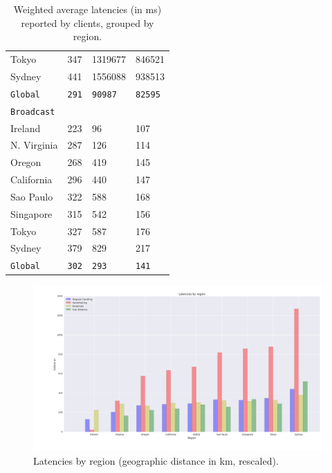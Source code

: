 \documentclass{uvamscse}
\begin{document}
\begin{table}[h]
\begin{center}
\begin{tabular}{llll}
  Tokyo                         & 347                 & 1319677              & 846521                 \\
  Sydney                        & 441                 & 1556088              & 938513                 \\
  \texttt{Global}               & \texttt{291}        & \texttt{90987}       & \texttt{82595}                 \\
  \hline
  \texttt{Broadcast} \\
  Ireland                       & 223                 & 96                   & 107                 \\
  N. Virginia                   & 287                 & 126                  & 114                 \\
  Oregon                        & 268                 & 419                  & 145                 \\
  California                    & 296                 & 440                  & 147                 \\
  Sao Paulo                     & 322                 & 588                  & 168                 \\
  Singapore                     & 315                 & 542                  & 156                 \\
  Tokyo                         & 327                 & 587                  & 176                 \\
  Sydney                        & 379                 & 829                  & 217                 \\
  \texttt{Global}               & \texttt{302}        & \texttt{293}         & \texttt{141}                 \\
\end{tabular}
\end{center}
\caption{Weighted average latencies (in ms) reported by clients, grouped by region.}
\label{table:regionlats}
\end{table}

\begin{figure}[h]
\centering
\includegraphics[scale=0.3]{latgeo}
\caption{Latencies by region (geographic distance in km, rescaled).}
\label{figure:latgeo}
\end{figure}
\end{document}
